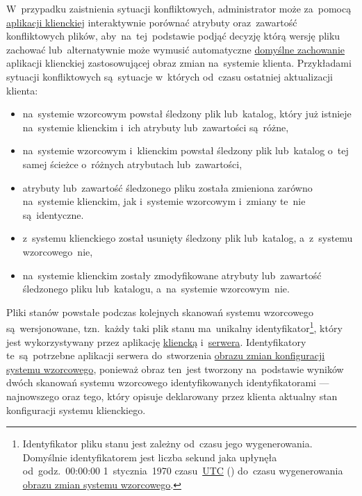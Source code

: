 \documentclass[thesis]{subfiles}
\begin{document}
W~przypadku zaistnienia sytuacji konfliktowych, administrator może za~pomocą \hyperref[sec:cli-app]{aplikacji klienckiej} interaktywnie porównać atrybuty oraz~zawartość konfliktowych plików, aby~na~tej~podstawie podjąć decyzję którą wersję pliku zachować lub~alternatywnie może wymusić automatyczne \hyperlink{itm:cli-force}{domyślne zachowanie} aplikacji klienckiej zastosowującej obraz zmian na~systemie klienta. Przykładami sytuacji konfliktowych są~sytuacje w~których od~czasu ostatniej aktualizacji klienta:\mynobreakpar
\begin{itemize}
	\item na~systemie wzorcowym powstał śledzony plik lub~katalog, który już istnieje na~systemie klienckim i~ich atrybuty lub~zawartości są~różne,
	\item na~systemie wzorcowym i~klienckim powstał śledzony plik lub~katalog o~tej samej ścieżce o~różnych atrybutach lub~zawartości,
	\item atrybuty lub~zawartość śledzonego pliku została zmieniona zarówno na~systemie klienckim, jak i~systemie wzorcowym i~zmiany te~nie są~identyczne.
	\item z~systemu klienckiego został usunięty śledzony plik lub~katalog, a~z~systemu wzorcowego~nie,
	\item na~systemie klienckim zostały zmodyfikowane atrybuty lub~zawartość śledzonego pliku lub~katalogu, a~na~systemie wzorcowym~nie.
\end{itemize}

Pliki stanów powstałe podczas kolejnych skanowań systemu wzorcowego są~wersjonowane, tzn.~każdy taki plik stanu ma~unikalny identyfikator\footnote{Identyfikator pliku stanu jest zależny od~czasu jego wygenerowania. Domyślnie identyfikatorem jest liczba sekund jaka upłynęła od~godz.~00:00:00 1~stycznia~1970 czasu~\href{https://en.wikipedia.org/wiki/Coordinated_Universal_Time}{UTC} () do~czasu wygenerowania \hyperref[sec:obraz-zmian-konfiguracji]{obrazu zmian systemu wzorcowego}.}, który jest wykorzystywany przez aplikację \hyperref[sec:cli-app]{kliencką} i~\hyperref[sec:srv-app]{serwera}. Identyfikatory te~są~potrzebne aplikacji serwera do~stworzenia \hyperref[sec:obraz-zmian-konfiguracji]{obrazu zmian konfiguracji systemu wzorcowego}, ponieważ obraz ten~jest tworzony na~podstawie wyników dwóch skanowań systemu wzorcowego identyfikowanych identyfikatorami --- najnowszego oraz tego, który opisuje deklarowany przez klienta aktualny stan konfiguracji systemu klienckiego.
\end{document}
